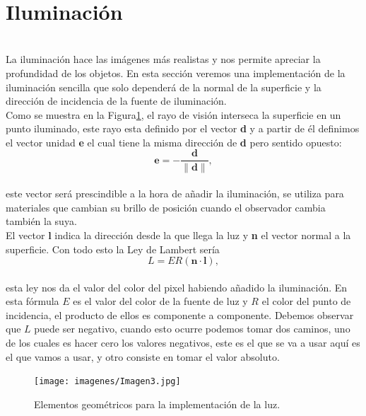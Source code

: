 ${ }$\\
\section{Iluminación}
${ }$\\

La iluminación hace las imágenes más realistas y nos permite apreciar la profundidad de los objetos. En esta sección veremos una implementación de la iluminación sencilla que solo dependerá de la normal de la superficie y la dirección de incidencia de la fuente de iluminación. 
${ }$\\

Como se muestra en la Figura\ref{fig:etiq_5}, el rayo de visión interseca la superficie en un punto iluminado, este rayo esta definido por el vector \textbf{d} y a partir de él definimos el vector unidad \textbf{e} el cual tiene la misma dirección de \textbf{d} pero sentido opuesto:
${ }$\\


\[
	\textbf{e} = - \frac{\textbf{d}}{\|\textbf{d}\|},
\]
${ }$\\
este vector será prescindible a la hora de añadir la iluminación, se utiliza para materiales que cambian su brillo de posición cuando el observador cambia también la suya.
${ }$\\


El vector \textbf{l} indica la dirección desde la que llega la luz y \textbf{n} el vector normal a la superficie. Con todo esto la Ley de Lambert sería
${ }$\\
\[
	L = ER(\textbf{n}\cdot \textbf{l}),
\]
${ }$\\
esta ley nos da el valor del color del pixel habiendo añadido la iluminación. En esta fórmula $E$ es el valor del color de la fuente de luz y $R$ el color del punto de incidencia, el producto de ellos es componente a componente. Debemos observar que $L$ puede ser negativo, cuando esto ocurre podemos tomar dos caminos, uno de los cuales es hacer cero los valores negativos, este es el que se va a usar aquí es el que vamos a usar, y otro consiste en tomar el valor absoluto.
	${ }$\\	


\begin{figure}[h]
	\begin{center}
		\texttt{[image: imagenes/Imagen3.jpg]}
	\end{center}
	\caption{Elementos geométricos para la implementación de la luz.}
	\label{fig:etiq_5}
\end{figure}





